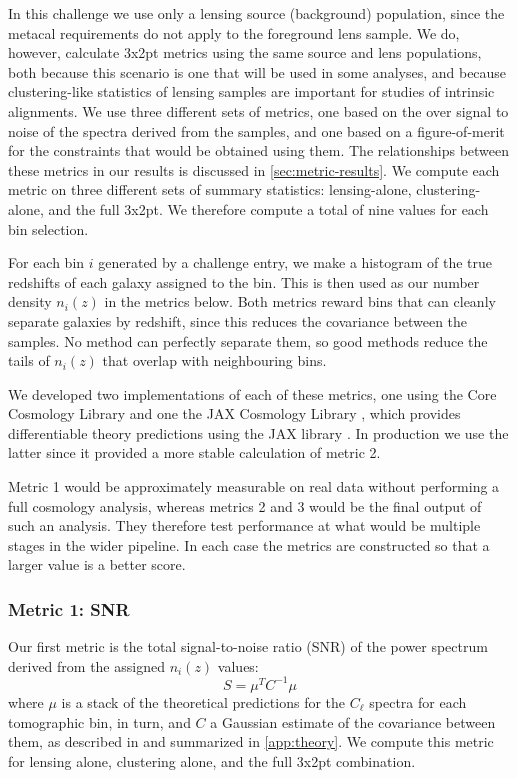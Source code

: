 \documentclass[twocolumn,twocolappendix]{aastex63}
\begin{document}
In this challenge we use only a lensing source (background) population, since the metacal requirements
do not apply to the foreground lens sample. We do, however, calculate 3x2pt metrics using the
same source and lens populations, both because this scenario is one that will be used in some analyses,
and because clustering-like statistics of lensing samples are important for studies of intrinsic
alignments. We use three different sets of metrics, one based on the over signal to noise of the spectra 
derived from the samples, and one based on a figure-of-merit for the constraints that would be obtained 
using them. The relationships between these metrics in our results is discussed in \autoref{sec:metric-results}.
We compute each metric on three different sets of summary statistics: lensing-alone, clustering-alone,
and the full 3x2pt. We therefore compute a total of nine values for each bin selection.

For each bin $i$ generated by a challenge entry, we make a histogram of the true redshifts 
of each galaxy assigned to the bin.  This is then used as our number density $n_i(z)$ in the metrics 
below. Both metrics reward bins that can
cleanly separate galaxies by redshift, since this reduces the covariance between the samples. No
method can perfectly separate them, so good methods reduce the tails of $n_i(z)$ that overlap with 
neighbouring bins.

We developed two implementations of each of these metrics, one using the Core Cosmology Library 
\citep{ccl} and one the JAX Cosmology Library \citep{jax-cosmo}, which provides differentiable theory 
predictions using the JAX library \citep{jax}.  In production we use the latter since it provided a
more stable calculation of metric 2.

Metric 1 would be approximately measurable on real data without performing a full cosmology analysis,
whereas metrics 2 and 3 would be the final output of such an analysis.  They therefore test performance at what
would be multiple stages in the wider pipeline. In each case the metrics are constructed so that a larger
value is a better score.

\subsubsection{Metric 1: SNR}

Our first metric is the total signal-to-noise ratio (SNR) of the power spectrum derived from the assigned
$n_i(z)$ values:
\begin{equation}
    S = \mu^{T} C^{-1} \mu
\label{eq:snr}
\end{equation}
where $\mu$ is a stack of the theoretical predictions for the $C_\ell$ spectra for each tomographic 
bin, in turn, and $C$ a Gaussian estimate of the covariance between them, as described in
\citet{takada_jain} and summarized in \autoref{app:theory}.   We compute this metric for lensing alone, clustering alone, and the full 3x2pt combination.
\end{document}
